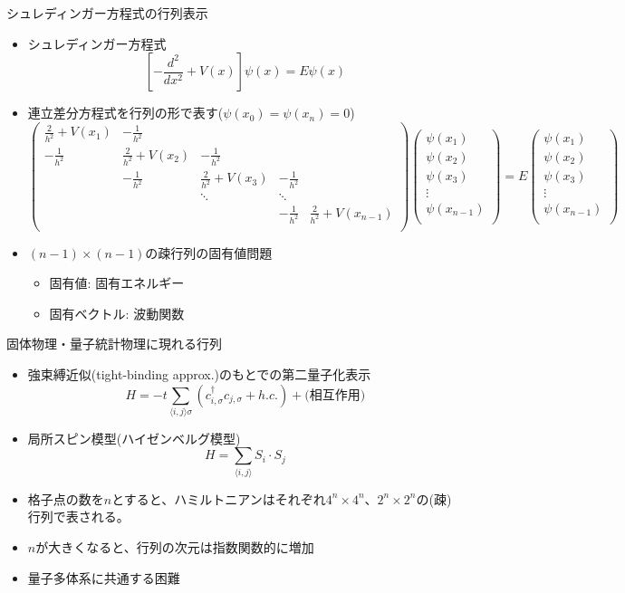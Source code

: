 \begin{frame}[t,fragile]{シュレディンガー方程式の行列表示}
  \begin{itemize}
  \item シュレディンガー方程式
    \[
    [-\frac{d^2}{dx^2}+V(x)]\psi(x) = E \psi(x)
    \]
  \item 連立差分方程式を行列の形で表す($\psi(x_0)=\psi(x_n)=0$)
    \[
    \begin{pmatrix}
      \frac{2}{h^2}+V(x_1) & -\frac{1}{h^2} \\
      -\frac{1}{h^2} & \frac{2}{h^2}+V(x_2) & -\frac{1}{h^2} \\
      & -\frac{1}{h^2} & \frac{2}{h^2}+V(x_3) & -\frac{1}{h^2} \\
      & & \ddots & \ddots \\
      & & & -\frac{1}{h^2} & \frac{2}{h^2}+V(x_{n-1}) \\
    \end{pmatrix}
    \begin{pmatrix}
      \psi(x_1) \\
      \psi(x_2) \\
      \psi(x_3) \\
      \vdots \\
      \psi(x_{n-1}) \\
    \end{pmatrix}
    = E
    \begin{pmatrix}
      \psi(x_1) \\
      \psi(x_2) \\
      \psi(x_3) \\
      \vdots \\
      \psi(x_{n-1}) \\
    \end{pmatrix}
    \]
  \item $(n-1) \times (n-1)$の疎行列の固有値問題
    \begin{itemize}
    \item 固有値: 固有エネルギー
    \item 固有ベクトル: 波動関数
    \end{itemize}
  \end{itemize}
\end{frame}

\begin{frame}[t,fragile]{固体物理・量子統計物理に現れる行列}
  \begin{itemize}
  \item 強束縛近似(tight-binding approx.)のもとでの第二量子化表示
    \[
    H = -t \sum_{\langle i,j \rangle \sigma} (c_{i,\sigma}^\dagger c_{j,\sigma} + h.c.) + \text{(相互作用)}
    \]
  \item 局所スピン模型(ハイゼンベルグ模型)
    \[
    H = \sum_{\langle i,j \rangle} S_i \cdot S_j
    \]
  \item 格子点の数を$n$とすると、ハミルトニアンはそれぞれ$4^n \times 4^n$、$2^n \times 2^n$の(疎)行列で表される。
  \item $n$が大きくなると、行列の次元は指数関数的に増加
  \item 量子多体系に共通する困難
  \end{itemize}
\end{frame}

